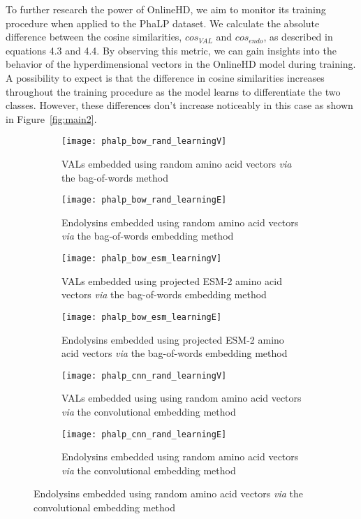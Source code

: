 To further research the power of OnlineHD, we aim to monitor its training procedure when applied to the PhaLP dataset. We calculate the absolute difference between the cosine similarities, $cos_{VAL}$ and $cos_{endo}$, as described in equations 4.3 and 4.4. By observing this metric, we can gain insights into the behavior of the hyperdimensional vectors in the OnlineHD model during training. A possibility to expect is that the difference in cosine similarities increases throughout the training procedure as the model learns to differentiate the two classes. However, these differences don't increase noticeably in this case as shown in Figure~\ref{fig:main2}.

\begin{figure}[htbp]
    \centering
    \begin{subfigure}{0.48\textwidth}
        \texttt{[image: phalp\_bow\_rand\_learningV]}
        \caption{VALs embedded using random amino acid vectors \textit{via} the bag-of-words method}
        \label{fig:subfig-a}
    \end{subfigure}
    \hfill
    \begin{subfigure}{0.48\textwidth}
        \texttt{[image: phalp\_bow\_rand\_learningE]}
        \caption{Endolysins embedded using random amino acid vectors \textit{via} the bag-of-words embedding method}
        \label{fig:subfig-b}
    \end{subfigure}
    
    \begin{subfigure}{0.48\textwidth}
        \texttt{[image: phalp\_bow\_esm\_learningV]}
        \caption{VALs embedded using projected ESM-2 amino acid vectors \textit{via} the bag-of-words embedding method}
        \label{fig:subfig-c}
    \end{subfigure}
    \hfill
    \begin{subfigure}{0.48\textwidth}
        \texttt{[image: phalp\_bow\_esm\_learningE]}
        \caption{Endolysins embedded using projected ESM-2 amino acid vectors \textit{via} the bag-of-words embedding method}
        \label{fig:subfig-d}
    \end{subfigure}
    
    \begin{subfigure}{0.48\textwidth}
        \texttt{[image: phalp\_cnn\_rand\_learningV]}
        \caption{VALs embedded using using random amino acid vectors \textit{via} the convolutional embedding method}
        \label{fig:subfig-e}
    \end{subfigure}
    \hfill
    \begin{subfigure}{0.48\textwidth}
        \texttt{[image: phalp\_cnn\_rand\_learningE]}
        \caption{Endolysins embedded using random amino acid vectors \textit{via} the convolutional embedding method}
        \label{fig:subfig-f}
    \end{subfigure}
    

\end{figure}
